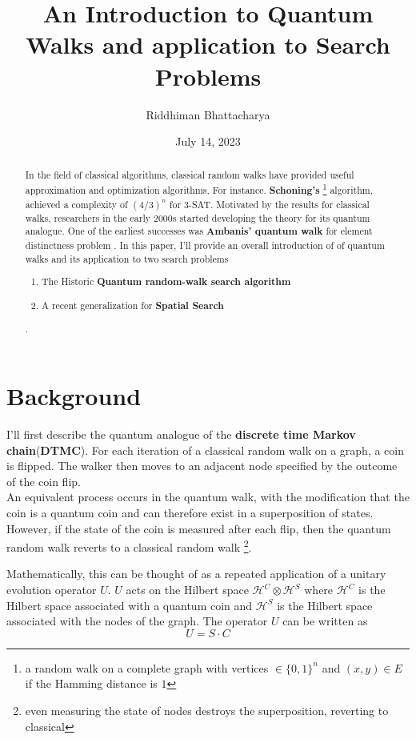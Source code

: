 \documentclass{article}
\title{\Huge \textbf{An Introduction to Quantum Walks and application to Search Problems}}
\author{Riddhiman  Bhattacharya}
\date{July 14, 2023}
\newcommand{\Hi}{\mathcal{H}}
\begin{document}
\maketitle

\begin{abstract}
    
\large

In the field of classical algorithms, classical random walks have provided useful approximation and optimization algorithms, For instance. \textbf{Schoning's} \cite{Schoning1999APA} \footnote{a random walk on a complete graph with vertices $\in \{0,1\}^n$ and $(x,y)\in E$ if the Hamming distance is $1$} algorithm, achieved a complexity of $(4/3)^n$ for $3$-SAT. Motivated by the results for classical walks,  researchers in the early 2000s started developing the theory for its quantum analogue. One of the earliest successes was \textbf{Ambanis' quantum walk} for element distinctness problem  \cite{Ambainis2003QuantumWA}. In this paper,  I'll provide an overall introduction of  of quantum walks \cite{Kempe2003QuantumRW} and its application to two search problems 
\begin{enumerate}
    \item The Historic \textbf{Quantum random-walk search algorithm} \cite{Shenvi2003QuantumRS}
    \item A recent generalization for \textbf{Spatial Search} \cite{Ambainis2019QuadraticSF}
\end{enumerate}
 .
\end{abstract}
\large
\section{Background}

I'll first describe the quantum analogue of the \textbf{discrete time Markov chain}(\textbf{DTMC}).
For each iteration of a classical random walk on a graph, a coin is flipped. The walker then moves to an adjacent node specified by the outcome of the coin flip.\\ An equivalent process occurs in the quantum walk, with the modification that the coin is a quantum coin and can therefore exist in a superposition of states. However, if the state of the coin is measured after each flip, then the quantum random walk reverts to
a classical random walk \footnote{even measuring the state of nodes destroys the superposition, reverting to classical}.

Mathematically, this can be thought of as a repeated application of a unitary evolution operator $U$.  $U$
acts on the Hilbert space $\Hi^C \otimes \Hi^S$
where $\Hi^C$ is the Hilbert space associated with a quantum coin and $\Hi^S$ is the Hilbert space associated with the nodes of the graph.  The operator $U$ can be written as
\begin{equation}\label{Equation::WalkDef}
U = S \cdot C
\end{equation}
\end{document}

